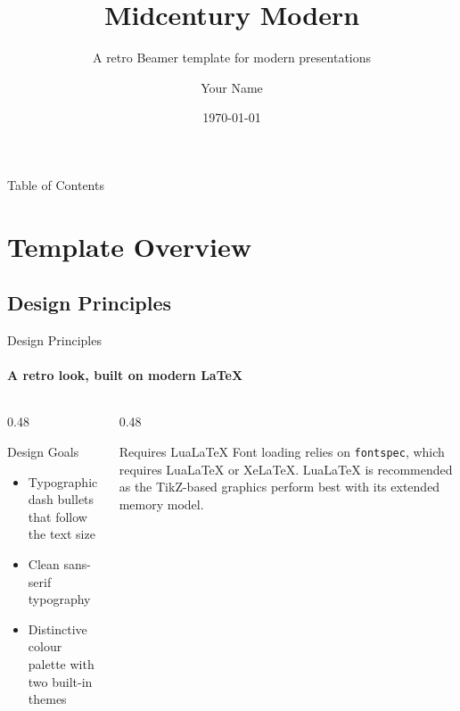 \documentclass[aspectratio=169]{beamer}
\title{Midcentury Modern}
\subtitle{A retro Beamer template for modern presentations}
\author{Your Name}
\institute{Your Institution}
\date{\today}
\begin{document}
\begin{frame}
  \titlepage
\end{frame}

\begin{frame}{Table of Contents}
  \tableofcontents
\end{frame}

\section{Template Overview}

\subsection{Design Principles}

\begin{frame}{Design Principles}
  \framesubtitle{A retro look, built on modern LaTeX}
  \begin{columns}[T]
    \begin{column}{0.48\textwidth}
      \begin{block}{Design Goals}
        \begin{itemize}
          \item Typographic dash bullets that follow the text size
          \item Clean sans-serif typography
          \item Distinctive colour palette with two built-in themes
        \end{itemize}
      \end{block}
    \end{column}
    \begin{column}{0.48\textwidth}
      \begin{alertblock}{Requires LuaLaTeX}
        Font loading relies on \texttt{fontspec}, which requires
        LuaLaTeX or XeLaTeX. LuaLaTeX is recommended as the
        TikZ-based graphics perform best with its extended memory
        model.
      \end{alertblock}
    \end{column}
  \end{columns}
\end{frame}
\end{document}
